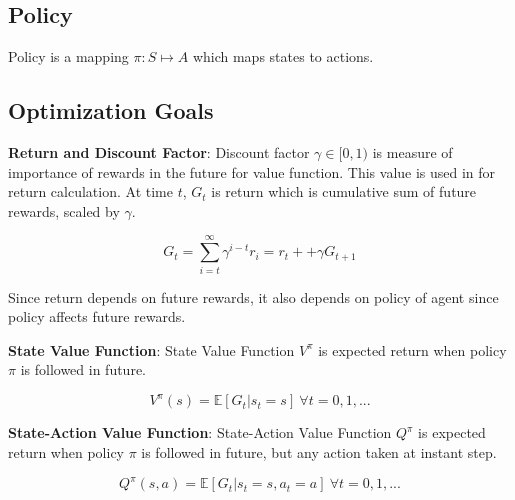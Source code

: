 \subsection{Policy}

Policy is a mapping $\pi \colon S \mapsto A$ which maps states to actions. 

\subsection{Optimization Goals}

\textbf{Return and Discount Factor}: Discount factor $\gamma \in [0,1)$ is measure of importance of rewards in the future for value function. This value is used in for return calculation. At time $t$, $G_t$ is return which is cumulative sum of future rewards, scaled by $\gamma$.

\begin{equation}
G_t = \sum_{i=t}^{\infty} \gamma^{i-t} r_i = r_t + + \gamma G_{t+1}
\end{equation}

Since return depends on future rewards, it also depends on policy of agent since policy affects future rewards.

\textbf{State Value Function}: State Value Function $V^{\pi}$ is expected return when policy $\pi$ is followed in future.

\begin{equation}
V^{\pi}(s) = \mathbb{E}[G_t|s_t=s] \: \forall t = 0,1, ...
\end{equation}

\textbf{State-Action Value Function}: State-Action Value Function $Q^{\pi}$ is expected return when policy $\pi$ is followed in future, but any action taken at instant step.

\begin{equation}
Q^{\pi}(s,a) = \mathbb{E}[G_t|s_t=s, a_t=a] \: \forall t = 0,1, ...
\end{equation}

